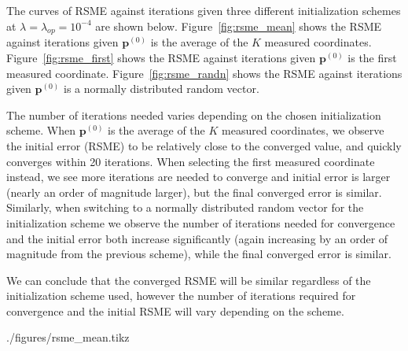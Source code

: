\documentclass[12pt]{article}
\begin{document}
The curves of RSME against iterations given three different initialization schemes at $\lambda = \lambda_{op} = 10^{-4}$ are shown below. Figure~\ref{fig:rsme_mean} shows the RSME against iterations given $\mathbf{p}^{(0)}$ is the average of the $K$ measured coordinates. Figure~\ref{fig:rsme_first} shows the RSME against iterations given $\mathbf{p}^{(0)}$ is the first measured coordinate. Figure~\ref{fig:rsme_randn} shows the RSME against iterations given $\mathbf{p}^{(0)}$ is a normally distributed random vector.

The number of iterations needed varies depending on the chosen initialization scheme. When $\mathbf{p}^{(0)}$ is the average of the $K$ measured coordinates, we observe the initial error (RSME) to be relatively close to the converged value, and quickly converges within 20 iterations. When selecting the first measured coordinate instead, we see more iterations are needed to converge and initial error is larger (nearly an order of magnitude larger), but the final converged error is similar. Similarly, when switching to a normally distributed random vector for the initialization scheme we observe the number of iterations needed for convergence and the initial error both increase significantly (again increasing by an order of magnitude from the previous scheme), while the final converged error is similar.

We can conclude that the converged RSME will be similar regardless of the initialization scheme used, however the number of iterations required for convergence and the initial RSME will vary depending on the scheme.  

\begin{filecontents}[overwrite]{./figures/rsme_mean.tikz}
\end{filecontents}
\end{document}
